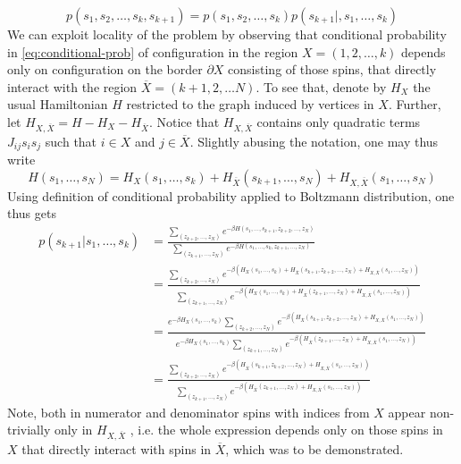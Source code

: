 \begin{equation}
\label{eq:conditional-prob}
    p(s_1, s_2, \ldots, s_k, s_{k+1}) = p(s_1, s_2, \ldots, s_k)p(s_{k+1}|, s_1, \ldots, s_k)
\end{equation}
We can exploit locality of the problem by observing that conditional probability in \eqref{eq:conditional-prob} of configuration in the region $X = (1, 2, \ldots, k)$ depends only on configuration on the border $\partial X$ consisting of those spins, that directly interact with the region $\overline{X} = (k+1, 2, \ldots N)$. To see that, denote by $H_X$ the usual Hamiltonian $H$ restricted to the graph induced by vertices in $X$. Further, let $H_{X, \overline{X}} = H - H_X - H_{\overline{X}}$. Notice that $H_{X, \overline{X}}$ contains only quadratic terms $J_{ij} s_i s_j$ such that $i \in X$ and $j \in \overline{X}$. Slightly abusing the notation, one may thus write
\begin{equation}
H(s_1, \ldots, s_N) = H_X(s_1, \ldots, s_k) + H_{\overline{X}}(s_{k+1}, \ldots, s_N) + H_{X, \overline{X}}(s_1, \ldots, s_N)
\end{equation}
Using definition of conditional probability applied to Boltzmann distribution, one thus gets
\begin{align}
    p(s_{k+1}|s_1, \ldots, s_k) &= \frac{\sum\limits_{(z_{k+2}, \ldots, z_N)}e^{-\beta H(s_1, \ldots, s_{k+1}, z_{k+2},\ldots,z_N)}}{\sum\limits_{(z_{k+1}, \ldots, z_N)}e^{-\beta H(s_1, \ldots, s_k, z_{k+1},\ldots,z_N)}} \\
    &= \frac{\sum\limits_{(z_{k+2}, \ldots, z_N)}e^{-\beta (H_X(s_1, \ldots, s_k) + H_{\overline{X}}(s_{k+1}, z_{k+2},\ldots,z_N) + H_{X, \overline{X}}(s_1, \ldots, z_N))}}{\sum\limits_{(z_{k+1}, \ldots, z_N)}e^{-\beta (H_X(s_1, \ldots, s_k) + H_{\overline{X}}(z_{k+1}, \ldots,z_N) + H_{X, \overline{X}}(s_1, \ldots, z_N))}} \\
    & = \frac{e^{-\beta H_X(s_1, \ldots, s_k)}\sum\limits_{(z_{k+2}, \ldots, z_N)} e^{-\beta(H_{\overline{X}}(s_{k+1}, z_{k+2},\ldots,z_N) + H_{X, \overline{X}}(s_1, \ldots, z_N))}}{e^{-\beta H_X(s_1, \ldots, s_k)}\sum\limits_{(z_{k+1}, \ldots, z_N)}e^{ -\beta(H_{\overline{X}}(z_{k+1}, \ldots,z_N) + H_{X, \overline{X}}(s_1, \ldots, z_N))}} \\
    & = \frac{\sum\limits_{(z_{k+2}, \ldots, z_N)} e^{-\beta(H_{\overline{X}}(s_{k+1}, z_{k+2},\ldots,z_N) + H_{X, \overline{X}}(s_1, \ldots, z_N))}}{\sum\limits_{(z_{k+1}, \ldots, z_N)}e^{ -\beta(H_{\overline{X}}(z_{k+1}, \ldots,z_N) + H_{X, \overline{X}}(s_1, \ldots, z_N))}}
\end{align}
Note, both in numerator and denominator spins with indices from $X$ appear non-trivially only in $H_{X, \overline{X}}$ , i.e. the whole expression depends only on those spins in $X$ that directly interact with spins in $\overline{X}$, which was to be demonstrated.


